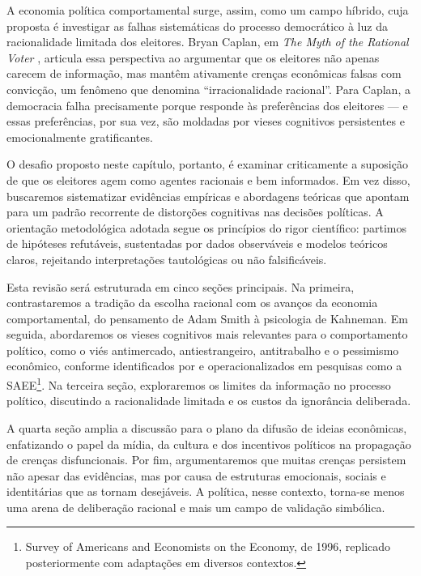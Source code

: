 A economia política comportamental surge, assim, como um campo híbrido, cuja proposta é investigar as falhas sistemáticas do processo democrático à luz da racionalidade limitada dos eleitores. Bryan Caplan, em \textit{The Myth of the Rational Voter} \citeyear{The_Myth_of_the_Rational_Voter}, articula essa perspectiva ao argumentar que os eleitores não apenas carecem de informação, mas mantêm ativamente crenças econômicas falsas com convicção, um fenômeno que denomina ``irracionalidade racional''. Para Caplan, a democracia falha precisamente porque responde às preferências dos eleitores — e essas preferências, por sua vez, são moldadas por vieses cognitivos persistentes e emocionalmente gratificantes.

O desafio proposto neste capítulo, portanto, é examinar criticamente a suposição de que os eleitores agem como agentes racionais e bem informados. Em vez disso, buscaremos sistematizar evidências empíricas e abordagens teóricas que apontam para um padrão recorrente de distorções cognitivas nas decisões políticas. A orientação metodológica adotada segue os princípios do rigor científico: partimos de hipóteses refutáveis, sustentadas por dados observáveis e modelos teóricos claros, rejeitando interpretações tautológicas ou não falsificáveis.

Esta revisão será estruturada em cinco seções principais. Na primeira, contrastaremos a tradição da escolha racional com os avanços da economia comportamental, do pensamento de Adam Smith à psicologia de Kahneman. Em seguida, abordaremos os vieses cognitivos mais relevantes para o comportamento político, como o viés antimercado, antiestrangeiro, antitrabalho e o pessimismo econômico, conforme identificados por \cite{Systematically_Biased_Beliefs_about_Economics} e operacionalizados em pesquisas como a SAEE\footnote{Survey of Americans and Economists on the Economy, de 1996, replicado posteriormente com adaptações em diversos contextos.}. Na terceira seção, exploraremos os limites da informação no processo político, discutindo a racionalidade limitada e os custos da ignorância deliberada.

A quarta seção amplia a discussão para o plano da difusão de ideias econômicas, enfatizando o papel da mídia, da cultura e dos incentivos políticos na propagação de crenças disfuncionais. Por fim, argumentaremos que muitas crenças persistem não apesar das evidências, mas por causa de estruturas emocionais, sociais e identitárias que as tornam desejáveis. A política, nesse contexto, torna-se menos uma arena de deliberação racional e mais um campo de validação simbólica.

